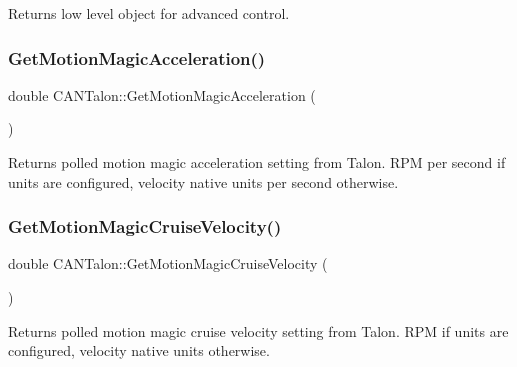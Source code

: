\begin{DoxyReturn}{Returns}
low level object for advanced control. 
\end{DoxyReturn}
\mbox{\label{class_c_a_n_talon_a43efe1fbbf9fb127d73fe4cfb3e805a2}} 
\subsubsection{\texorpdfstring{Get\+Motion\+Magic\+Acceleration()}{GetMotionMagicAcceleration()}}
{\footnotesize\ttfamily double C\+A\+N\+Talon\+::\+Get\+Motion\+Magic\+Acceleration (\begin{DoxyParamCaption}{ }\end{DoxyParamCaption})}

\begin{DoxyReturn}{Returns}
polled motion magic acceleration setting from Talon. R\+PM per second if units are configured, velocity native units per second otherwise. 
\end{DoxyReturn}
\mbox{\label{class_c_a_n_talon_ac1f45ea28e5b53838ed645aa1fbaf30c}} 
\subsubsection{\texorpdfstring{Get\+Motion\+Magic\+Cruise\+Velocity()}{GetMotionMagicCruiseVelocity()}}
{\footnotesize\ttfamily double C\+A\+N\+Talon\+::\+Get\+Motion\+Magic\+Cruise\+Velocity (\begin{DoxyParamCaption}{ }\end{DoxyParamCaption})}

\begin{DoxyReturn}{Returns}
polled motion magic cruise velocity setting from Talon. R\+PM if units are configured, velocity native units otherwise. 
\end{DoxyReturn}
\mbox{\label{class_c_a_n_talon_a67e151009a27f9ce3317fc040fb85d2a}} 
